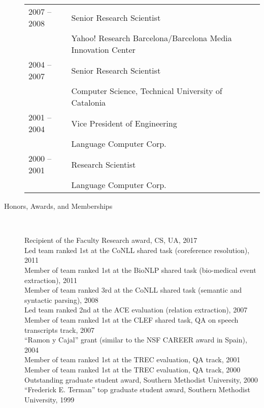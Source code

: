 \documentclass[10pt]{article}
\begin{document}
\begin{description}
\begin{tabular}{lp{4.9in}}
\hspace{-.2cm}2007 -- 2008 & Senior Research Scientist\\\vspace{.1cm}
& {\sc Yahoo! Research Barcelona/Barcelona Media Innovation Center} \\

\hspace{-.2cm}2004 -- 2007 & Senior Research Scientist\\\vspace{.1cm}
& Computer Science, {\sc Technical University of Catalonia} \\

\hspace{-.2cm}2001 -- 2004 & Vice President of Engineering\\\vspace{.1cm}
& {\sc Language Computer Corp.} \\

\hspace{-.2cm}2000 -- 2001 & Research Scientist\\
& {\sc Language Computer Corp.} 

\end{tabular}

\vspace{-.3cm}
\item [Honors, Awards, and Memberships]\

Recipient of the Faculty Research award, CS, UA, 2017 \\
Led team ranked 1st  at the CoNLL shared task (coreference resolution), 2011 \\
Member of team ranked 1st at the BioNLP shared task (bio-medical event extraction), 2011\\
Member of team ranked 3rd at the CoNLL shared task (semantic and syntactic parsing), 2008\\
Led team ranked 2nd at the ACE evaluation (relation extraction), 2007\\
Member of team ranked 1st at the CLEF shared task, QA on speech transcripts track, 2007\\
``Ramon y Cajal'' grant (similar to the NSF CAREER award in Spain), 2004 \\
Member of team ranked 1st at the TREC evaluation, QA track, 2001\\
Member of team ranked 1st at the TREC evaluation, QA track, 2000 \\
Outstanding graduate student award, Southern Methodist University, 2000 \\
``Frederick E. Terman'' top graduate student award, Southern Methodist University, 1999 \\


\end{description}
\end{document}
